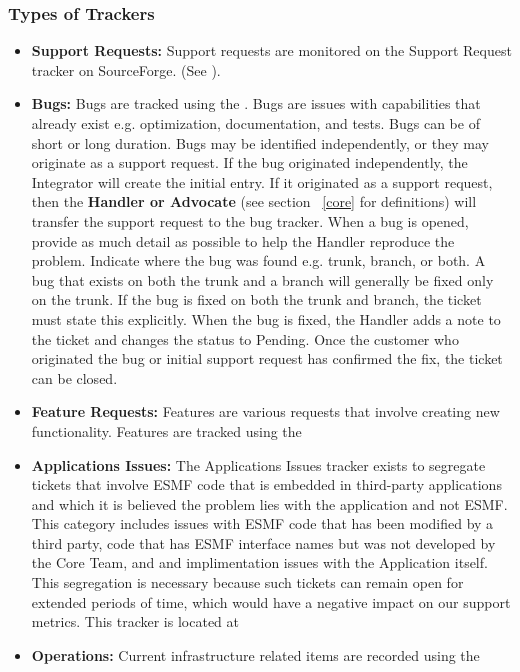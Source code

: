 \subsubsection{Types of Trackers}
\label{sec:trackertypes}
\begin{itemize}
\item {\bf Support Requests:} Support requests are monitored on the Support Request tracker on SourceForge. 
(See ). 

\item {\bf Bugs:} Bugs are tracked using the . Bugs are issues with capabilities that already exist e.g. optimization, documentation, and tests. Bugs can be of short or long duration.  
Bugs may be identified independently, or they may originate as a support request. If the bug originated independently, the Integrator will create the initial entry. If it originated as a support request, then the {\bf Handler or Advocate} (see section ~\ref{core} for definitions) will transfer the support request to the bug tracker. When a bug is opened, provide as much detail as possible to help the Handler reproduce the problem. Indicate where the bug was found e.g. trunk, branch, or both. A bug that exists on both the trunk and a branch will generally be fixed only on the trunk. If the bug is fixed on both the trunk and branch, the ticket must  state this explicitly. When the bug is fixed, the Handler adds a note to the ticket and changes the status to Pending. Once the customer who originated the bug or initial support request has confirmed the fix, the ticket can be closed.

\item {\bf Feature Requests:} Features are various requests that involve creating new functionality. Features are tracked using the 

\item{\bf Applications Issues:} The Applications Issues tracker exists to segregate tickets that
involve ESMF code that is embedded in third-party applications and which it is believed the problem
lies with the application and not ESMF. This category includes issues with ESMF code that
has been modified by a third party, code that has ESMF interface names but was not developed by
the Core Team, and and implimentation issues with the Application itself. This segregation is
necessary because such tickets can remain open for extended periods of time, which would have
a negative impact on our support metrics. This tracker is located at

\item {\bf Operations:} Current infrastructure related items are recorded using the
\end{itemize}




